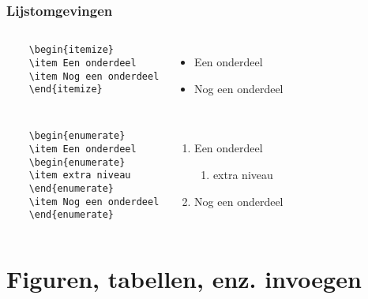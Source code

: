 \documentclass[aspectratio=169]{beamer}
\begin{document}
\begin{frame}[fragile]
  \frametitle{Lijstomgevingen}
  
  \begin{columns}[c]
    \begin{verbatim}  
    \begin{itemize}
    \item Een onderdeel
    \item Nog een onderdeel
    \end{itemize}
    \end{verbatim}
    
    \begin{itemize}
      \item Een onderdeel
      \item Nog een onderdeel
    \end{itemize}
  \end{columns}
  
  \pause
  
  \begin{columns}[c]
    \begin{verbatim}  
    \begin{enumerate}
    \item Een onderdeel
    \begin{enumerate}
    \item extra niveau
    \end{enumerate}
    \item Nog een onderdeel
    \end{enumerate}
    \end{verbatim}
    
    \begin{enumerate}
      \item Een onderdeel
      \begin{enumerate}
        \item extra niveau
      \end{enumerate}
      \item Nog een onderdeel
    \end{enumerate}
  \end{columns}
  
\end{frame}

\section{Figuren, tabellen, enz. invoegen}
\end{document}
